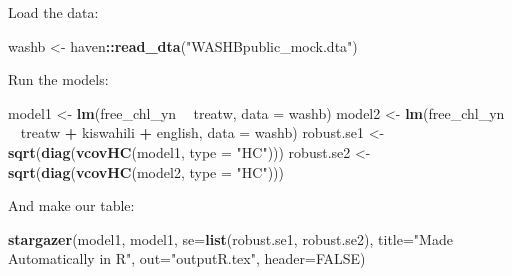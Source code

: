 \documentclass[11pt,]{article}
\newenvironment{Shaded}{\begin{snugshade}}{\end{snugshade}}
\newcommand{\DataTypeTok}[1]{\textcolor[rgb]{0.13,0.29,0.53}{#1}}
\newcommand{\KeywordTok}[1]{\textcolor[rgb]{0.13,0.29,0.53}{\textbf{#1}}}
\newcommand{\NormalTok}[1]{#1}
\newcommand{\OperatorTok}[1]{\textcolor[rgb]{0.81,0.36,0.00}{\textbf{#1}}}
\newcommand{\OtherTok}[1]{\textcolor[rgb]{0.56,0.35,0.01}{#1}}
\newcommand{\StringTok}[1]{\textcolor[rgb]{0.31,0.60,0.02}{#1}}
\begin{document}
Load the data:

\begin{Shaded}
\begin{Highlighting}[]
\NormalTok{washb <-}\StringTok{ }\NormalTok{haven}\OperatorTok{::}\KeywordTok{read_dta}\NormalTok{(}\StringTok{"WASHBpublic_mock.dta"}\NormalTok{)}
\end{Highlighting}
\end{Shaded}

Run the models:

\begin{Shaded}
\begin{Highlighting}[]
\NormalTok{model1 <-}\StringTok{ }\KeywordTok{lm}\NormalTok{(free_chl_yn }\OperatorTok{~}\StringTok{ }\NormalTok{treatw, }\DataTypeTok{data =}\NormalTok{ washb) }
\NormalTok{model2 <-}\StringTok{ }\KeywordTok{lm}\NormalTok{(free_chl_yn }\OperatorTok{~}\StringTok{ }\NormalTok{treatw }\OperatorTok{+}\StringTok{ }\NormalTok{kiswahili }\OperatorTok{+}\StringTok{ }\NormalTok{english, }\DataTypeTok{data =}\NormalTok{ washb)}
\NormalTok{robust.se1 <-}\StringTok{ }\KeywordTok{sqrt}\NormalTok{(}\KeywordTok{diag}\NormalTok{(}\KeywordTok{vcovHC}\NormalTok{(model1, }\DataTypeTok{type =} \StringTok{"HC"}\NormalTok{)))}
\NormalTok{robust.se2 <-}\StringTok{ }\KeywordTok{sqrt}\NormalTok{(}\KeywordTok{diag}\NormalTok{(}\KeywordTok{vcovHC}\NormalTok{(model2, }\DataTypeTok{type =} \StringTok{"HC"}\NormalTok{)))}
\end{Highlighting}
\end{Shaded}

And make our table:

\begin{Shaded}
\begin{Highlighting}[]
\KeywordTok{stargazer}\NormalTok{(model1, model1, }\DataTypeTok{se=}\KeywordTok{list}\NormalTok{(robust.se1, robust.se2), }
          \DataTypeTok{title=}\StringTok{"Made Automatically in R"}\NormalTok{, }
          \DataTypeTok{out=}\StringTok{"outputR.tex"}\NormalTok{, }\DataTypeTok{header=}\OtherTok{FALSE}\NormalTok{)}
\end{Highlighting}
\end{Shaded}
\end{document}
